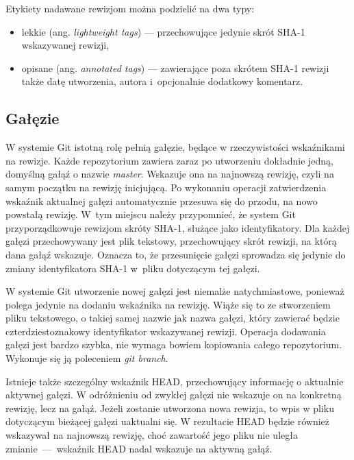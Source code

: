 \documentclass[12pt,a4paper,polish,thesis]{dcsbook}
\begin{document}
	Etykiety nadawane rewizjom można podzielić na dwa typy:
	\begin{itemize}
		\item lekkie (ang. \textit{lightweight tags}) --- przechowujące jedynie skrót SHA-1 wskazywanej rewizji,
		\item opisane (ang. \textit{annotated tags}) --- zawierające poza skrótem SHA-1 rewizji także datę utworzenia, autora i~opcjonalnie dodatkowy komentarz.
	\end{itemize}

	\subsection{Gałęzie} \label{Galezie}
	W systemie Git istotną rolę pełnią gałęzie, będące w rzeczywistości wskaźnikami na rewizje.
	Każde repozytorium zawiera zaraz po utworzeniu dokładnie jedną, domyślną gałąź o nazwie \textit{master}. Wskazuje ona na najnowszą rewizję, czyli na samym początku na rewizję inicjującą. Po wykonaniu operacji zatwierdzenia wskaźnik aktualnej gałęzi automatycznie przesuwa się do przodu, na nowo powstałą rewizję. W~tym miejscu należy przypomnieć, że system Git przyporządkowuje rewizjom skróty \mbox{SHA-1}, służące jako identyfikatory. Dla każdej gałęzi przechowywany jest plik tekstowy, przechowujący skrót rewizji, na którą dana gałąź wskazuje. Oznacza to, że przesunięcie gałęzi sprowadza się jedynie do zmiany identyfikatora \mbox{SHA-1} w~pliku dotyczącym tej gałęzi.

	W systemie Git utworzenie nowej gałęzi jest niemalże natychmiastowe, ponieważ polega jedynie na dodaniu wskaźnika na rewizję. Wiąże się to ze stworzeniem pliku tekstowego, o takiej samej nazwie jak nazwa gałęzi, który zawierać będzie czterdziestoznakowy identyfikator wskazywanej rewizji. Operacja dodawania gałęzi jest bardzo szybka, nie wymaga bowiem kopiowania całego repozytorium.
	Wykonuje się ją poleceniem \textit{git branch}.

	Istnieje także szczególny wskaźnik HEAD, przechowujący informację o aktualnie aktywnej gałęzi. W odróżnieniu od zwykłej gałęzi nie wskazuje on na konkretną rewizję, lecz na gałąź. Jeżeli zostanie utworzona nowa rewizja, to wpis w pliku dotyczącym bieżącej gałęzi uaktualni się. W rezultacie HEAD będzie również wskazywał na najnowszą rewizję, choć zawartość jego pliku nie uległa zmianie~---~wskaźnik HEAD nadal wskazuje na aktywną gałąź.
\end{document}

